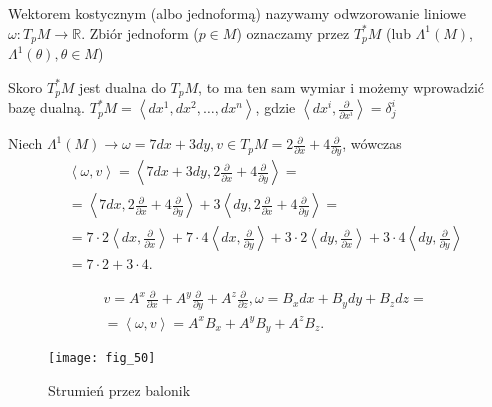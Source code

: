 \documentclass[../main.tex]{subfiles}
\begin{document}
    \begin{definicja}
        Wektorem kostycznym (albo jednoformą) nazywamy odwzorowanie liniowe  $\omega: T_pM\to\mathbb{R}$.
        Zbiór jednoform ($p\in M$) oznaczamy przez $T_p^* M$ (lub $\Lambda^1(M)$, $\Lambda^1(\theta), \theta\in M$)
    \end{definicja}
    Skoro $T_p^* M$ jest dualna do $T_pM$, to ma ten sam wymiar i możemy wprowadzić bazę dualną. $T_p^*M = \left< dx^1, dx^2, \ldots, dx^n \right>$, gdzie $\left<dx^i, \frac{\partial }{\partial x^i}  \right> = \delta^i_j$
    \begin{przyklad}
        Niech $\Lambda^1(M)\to\omega = 7dx + 3dy, v\in T_pM = 2 \frac{\partial }{\partial x} +4 \frac{\partial }{\partial y} $, wówczas
        \begin{align*}
            &\left<\omega,v \right> = \left<7dx+3dy,2 \frac{\partial }{\partial x} + 4 \frac{\partial }{\partial y}  \right> =\\
            &= \left<7dx, 2 \frac{\partial }{\partial x} + 4 \frac{\partial }{\partial y}  \right> + 3 \left< dy, 2 \frac{\partial }{\partial x} + 4 \frac{\partial }{\partial y}  \right> = \\
            &= 7\cdot 2\left<dx,\frac{\partial }{\partial x}  \right> + 7\cdot 4 \left<dx, \frac{\partial }{\partial y}  \right> + 3\cdot 2 \left<dy,\frac{\partial }{\partial x}\right> + 3\cdot 4 \left<dy , \frac{\partial }{\partial y} \right> \\
            &= 7\cdot 2+ 3\cdot 4
        .\end{align*}
    \end{przyklad}
    \begin{przyklad}
        \begin{align*}
            &v = A^x \frac{\partial }{\partial x} + A^y \frac{\partial }{\partial y} + A^z \frac{\partial }{\partial z} , \omega = B_xdx + B_ydy + B_zdz=\\
            &= \left<\omega,v \right> = A^xB_x + A^yB_y + A^zB_z
        .\end{align*}
    \end{przyklad}
    \begin{figure}
        \centering
        \texttt{[image: fig\_50]}
        \caption{Strumień przez balonik}
    \end{figure}
\end{document}
